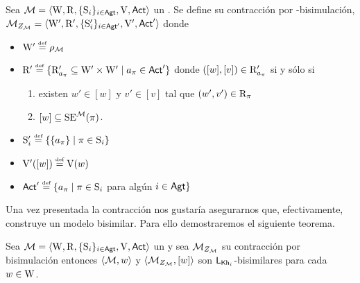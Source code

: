 \begin{definicion}\label{def:1st-contraction}
    Sea $\mathcal{M}=\langle \mathrm{W},\mathrm{R},\{ \mathrm{S}_i \}_{i \in {\rm \sf Agt}},\mathrm{V},{\rm \sf Act} \rangle$ un \ults. Se define su contracción por \KHilogic-bisimulación, 
    $\mathcal{M}_{Z_{\mathcal{M}}}=\langle \mathrm{W}',\mathrm{R}',\{ \mathrm{S}_i' \}_{i \in {\rm \sf Agt}'},\mathrm{V}',{\rm \sf Act}' \rangle$ donde 
    \begin{center}
        \begin{itemize}
            \item $\W' \eqdef \rho_\model$
            \item $\R' \eqdef \{\R'_{a_\pi} \subseteq \W' \times \W' \mid a_\pi \in \ACT'\}$ donde $([w],[v]) \in \mathrm{R}'_{a_\pi}$ si y sólo si
            \begin{enumerate}
                \item existen $w' \in [w]$ y $v' \in [v]$ tal que $(w',v')\in \mathrm{R}_\pi$
                \item $[w] \subseteq \mathrm{SE}^{\mathcal{M}}(\pi)$.
            \end{enumerate}
            \item $\S_i' \eqdef \{ \{a_\pi\} \mid \pi \in \S_i \}$
            \item $\V'([w]) \eqdef \V(w)$
            \item $\ACT' \eqdef \{a_\pi \mid \pi\in \S_i$ para algún $i \in {\rm \sf Agt} \}$ 
        \end{itemize}
    \end{center}
\end{definicion}
    
Una vez presentada la contracción nos gustaría asegurarnos que, efectivamente, construye un modelo bisimilar. Para ello demostraremos el 
siguiente teorema.

\begin{teorema}\label{thm:adequacy-1st-cont}
    Sea $\mathcal{M}=\langle \mathrm{W},\mathrm{R},\{ \mathrm{S}_i \}_{i \in {\rm \sf Agt}},\mathrm{V},{\rm \sf Act} \rangle$ un \ults y sea $\mathcal{M}_{Z_{\mathcal{M}}}$ su contracción por bisimulación entonces 
    $\langle \mathcal{M},w \rangle$ y $\langle \mathcal{M}_{Z_{\mathcal{M}}},[w] \rangle$ son $\mathsf{L}_{\mathsf{Kh}_i}$-bisimilares para cada $w \in \mathrm{W}$.
\end{teorema}

